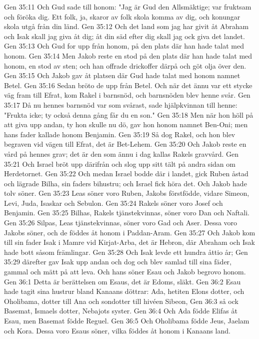 Gen 35:11  Och Gud sade till honom: "Jag är Gud den Allsmäktige; var fruktsam och föröka dig. Ett folk, ja, skaror av folk skola komma av dig, och konungar skola utgå från din länd.
Gen 35:12  Och det land som jag har givit åt Abraham och Isak skall jag giva åt dig; åt din säd efter dig skall jag ock giva det landet.
Gen 35:13  Och Gud for upp från honom, på den plats där han hade talat med honom.
Gen 35:14  Men Jakob reste en stod på den plats där han hade talat med honom, en stod av sten; och han offrade drickoffer därpå och göt olja över den.
Gen 35:15  Och Jakob gav åt platsen där Gud hade talat med honom namnet Betel.
Gen 35:16  Sedan bröto de upp från Betel. Och när det ännu var ett stycke väg fram till Efrat, kom Rakel i barnsnöd, och barnsnöden blev henne svår.
Gen 35:17  Då nu hennes barnsnöd var som svårast, sade hjälpkvinnan till henne: "Frukta icke; ty också denna gång får du en son."
Gen 35:18  Men när hon höll på att giva upp andan, ty hon skulle nu dö, gav hon honom namnet Ben-Oni; men hans fader kallade honom Benjamin.
Gen 35:19  Så dog Rakel, och hon blev begraven vid vägen till Efrat, det är Bet-Lehem.
Gen 35:20  Och Jakob reste en vård på hennes grav; det är den som ännu i dag kallas Rakels gravvård.
Gen 35:21  Och Israel bröt upp därifrån och slog upp sitt tält på andra sidan om Herdetornet.
Gen 35:22  Och medan Israel bodde där i landet, gick Ruben åstad och lägrade Bilha, sin faders bihustru; och Israel fick höra det. Och Jakob hade tolv söner.
Gen 35:23  Leas söner voro Ruben, Jakobs förstfödde, vidare Simeon, Levi, Juda, Isaskar och Sebulon.
Gen 35:24  Rakels söner voro Josef och Benjamin.
Gen 35:25  Bilhas, Rakels tjänstekvinnas, söner voro Dan och Naftali.
Gen 35:26  Silpas, Leas tjänstekvinnas, söner voro Gad och Aser. Dessa voro Jakobs söner, och de föddes åt honom i Paddan-Aram.
Gen 35:27  Och Jakob kom till sin fader Isak i Mamre vid Kirjat-Arba, det är Hebron, där Abraham och Isak hade bott såsom främlingar.
Gen 35:28  Och Isak levde ett hundra åttio år;
Gen 35:29  därefter gav Isak upp andan och dog och blev samlad till sina fäder, gammal och mätt på att leva. Och hans söner Esau och Jakob begrovo honom.
Gen 36:1  Detta är berättelsen om Esaus, det är Edoms, släkt.
Gen 36:2  Esau hade tagit sina hustrur bland Kanaans döttrar: Ada, hetiten Elons dotter, och Oholibama, dotter till Ana och sondotter till hivéen Sibeon,
Gen 36:3  så ock Basemat, Ismaels dotter, Nebajots syster.
Gen 36:4  Och Ada födde Elifas åt Esau, men Basemat födde Reguel.
Gen 36:5  Och Oholibama födde Jeus, Jaelam och Kora. Dessa voro Esaus söner, vilka föddes åt honom i Kanaans land.
